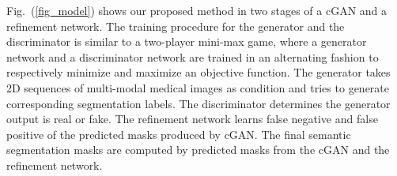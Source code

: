 \documentclass[10pt,twocolumn,letterpaper]{article}
\begin{document}

Fig.~(\ref{fig_model}) shows our proposed method in two stages of a cGAN and a refinement network. The training procedure for the generator and the discriminator is similar to a two-player mini-max game, where a generator network and a discriminator network are trained in an alternating fashion to respectively minimize and maximize an objective function.
The generator takes 2D sequences of multi-modal medical images as condition and tries to generate corresponding segmentation labels. The discriminator determines the generator output is real or fake.
The refinement network learns false negative and false positive of the predicted masks produced by cGAN. The final semantic segmentation masks are computed by predicted masks from the cGAN and the refinement network.
\end{document}
